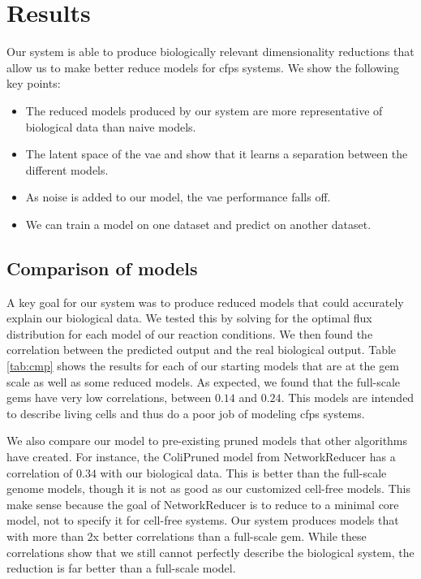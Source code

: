 \chapter{Results}\label{chap:res}
Our system is able to produce biologically relevant dimensionality reductions that allow us to make better reduce models for \gls{cfps} systems.
We show the following key points:
\begin{itemize}
\item The reduced models produced by our system are more representative of biological data than naive models.
\item The latent space of the \gls{vae} and show that it learns a separation between the different models.
\item As noise is added to our model, the \gls{vae} performance falls off.
\item We can train a model on one dataset and predict on another dataset.
\end{itemize}



\section{Comparison of models}\label{sec:cmp}
A key goal for our system was to produce reduced models that could accurately explain our biological data.
We tested this by solving for the optimal flux distribution for each model of our reaction conditions.
We then found the correlation between the predicted output and the real biological output.
Table \ref{tab:cmp} shows the results for each of our starting models that are at the \gls{gem} scale as well as some reduced models.
As expected, we found that the full-scale \glspl{gem} have very low correlations, between $0.14$ and $0.24$.
This models are intended to describe living \ecoli cells and thus do a poor job of modeling \gls{cfps} systems.

We also compare our model to pre-existing pruned models that other algorithms have created.
For instance, the ColiPruned model from NetworkReducer has a correlation of $0.34$ with our biological data.
This is better than the full-scale genome models, though it is not as good as our customized cell-free models.
This make sense because the goal of NetworkReducer is to reduce to a minimal core model, not to specify it for cell-free systems.
Our system produces models that with more than 2x better correlations than a full-scale \gls{gem}.
While these correlations show that we still cannot perfectly describe the biological system, the reduction is far better than a full-scale model.

